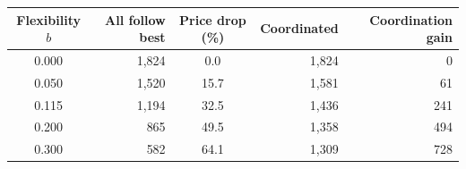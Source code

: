 \renewcommand{\arraystretch}{1.25}
\footnotesize
\begin{tabular}{|c|r|c|r|r|}
\hline
\textbf{Flexibility $b$} & \textbf{All follow best} & \textbf{Price drop (\%)} & \textbf{Coordinated} & \textbf{Coordination gain} \\
\hline
0.000 & 1,824 & 0.0 & 1,824 & 0 \\
\hline
0.050 & 1,520 & 15.7 & 1,581 & 61 \\
\hline
0.115 & 1,194 & 32.5 & 1,436 & 241 \\
\hline
0.200 & 865 & 49.5 & 1,358 & 494 \\
\hline
0.300 & 582 & 64.1 & 1,309 & 728 \\
\hline
\end{tabular}

